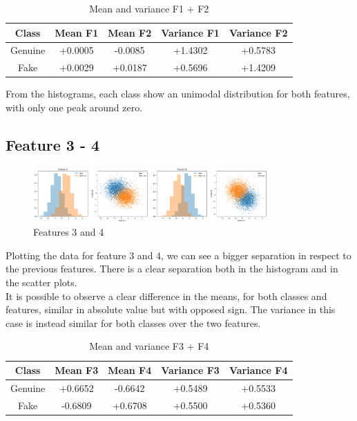 \documentclass[12pt, a4paper]{article}
\begin{document}
\begin{table}[ht!]
	\centering
	\begin{tabular}{| | c c c c c | |} 
		\hline
		Class & Mean F1 & Mean F2 & Variance F1 & Variance F2\\
		\hline\hline
 		Genuine & +0.0005 & -0.0085 & +1.4302 & +0.5783\\
 		\hline
 		Fake    & +0.0029 & +0.0187 & +0.5696 & +1.4209\\
 		\hline
 	\end{tabular}
	\caption{Mean and variance F1 + F2}
\end{table}

From the histograms, each class show an unimodal distribution for both features, with only one peak around zero.

\subsection{Feature 3 - 4}

\begin{figure}[ht]
	\centering
	\includegraphics[width=0.8\textwidth]{features_3_4}
	\caption{Features 3 and 4}
	\label{fig:features3_4}
\end{figure}

Plotting the data for feature 3 and 4, we can see a bigger separation in respect to the previous features. There is a clear separation both in the histogram and in the scatter plots.\\
It is possible to observe a clear difference in the means, for both classes and features, similar in absolute value but with opposed sign. The variance in this case is instead similar for both classes over the two features.

\begin{table}[ht!]
	\centering
 	\begin{tabular}{| | c c c c c | |} 
 		\hline
 		Class & Mean F3 & Mean F4 & Variance F3 & Variance F4\\
 		\hline\hline
		Genuine & +0.6652 & -0.6642 & +0.5489 & +0.5533\\
 		\hline
 		Fake    & -0.6809 & +0.6708 & +0.5500 & +0.5360\\
 		\hline
 	\end{tabular}
	\caption{Mean and variance F3 + F4}
\end{table}
\end{document}
